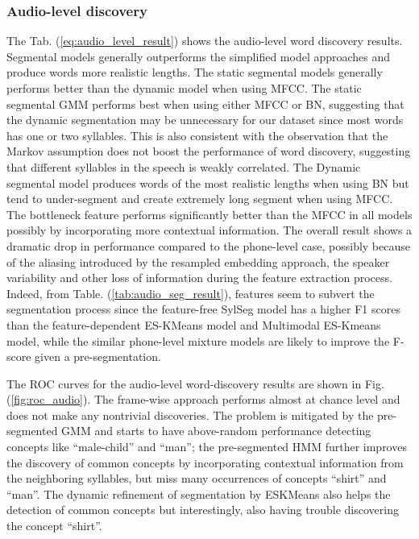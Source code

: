 \documentclass[journal]{IEEEtran}
\begin{document}
\subsubsection{Audio-level discovery}
The Tab. (\ref{eq:audio_level_result}) shows the audio-level word discovery results. Segmental models generally outperforms the simplified model approaches and produce words more realistic lengths. The static segmental models generally performs better than the dynamic model when using MFCC. The static segmental GMM performs best when using either MFCC or BN, suggesting that the dynamic segmentation may be unnecessary for our dataset since most words has one or two syllables. This is also consistent with the observation that the Markov assumption does not boost the performance of word discovery, suggesting that different syllables in the speech is weakly correlated. The Dynamic segmental model produces words of the most realistic lengths when using BN but tend to under-segment and create extremely long segment when using MFCC. The bottleneck feature performs significantly better than the MFCC in all models possibly by incorporating more contextual information. The overall result shows a dramatic drop in performance compared to the phone-level case, possibly because of the aliasing introduced by the resampled embedding approach, the speaker variability and other loss of information during the feature extraction process. Indeed, from Table. (\ref{tab:audio_seg_result}), features seem to subvert the segmentation process since the feature-free SylSeg model has a higher F1 scores than the feature-dependent ES-KMeans model and Multimodal ES-Kmeans model, while the similar phone-level mixture models are likely to improve the F-score given a pre-segmentation. 

The ROC curves for the audio-level word-discovery results are shown in Fig. (\ref{fig:roc_audio}). The frame-wise approach performs almost at chance level and does  not make any nontrivial discoveries. The problem is mitigated by the pre-segmented GMM and starts to have above-random performance detecting concepts like ``male-child'' and ``man''; the pre-segmented HMM further improves the discovery of common concepts by incorporating contextual information from the neighboring syllables, but miss many occurrences of concepts ``shirt'' and ``man''. The dynamic refinement of segmentation by ESKMeans also helps the detection of common concepts but interestingly, also having trouble discovering the concept ``shirt''.   
\end{document}
